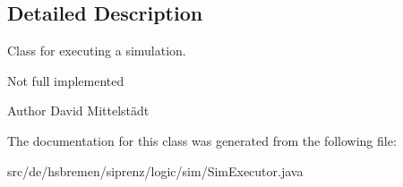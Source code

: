 \subsection{Detailed Description}
Class for executing a simulation. 

Not full implemented

\begin{DoxyAuthor}{Author}
David Mittelstädt 
\end{DoxyAuthor}


The documentation for this class was generated from the following file\+:\begin{DoxyCompactItemize}
\item 
src/de/hsbremen/siprenz/logic/sim/Sim\+Executor.\+java\end{DoxyCompactItemize}
